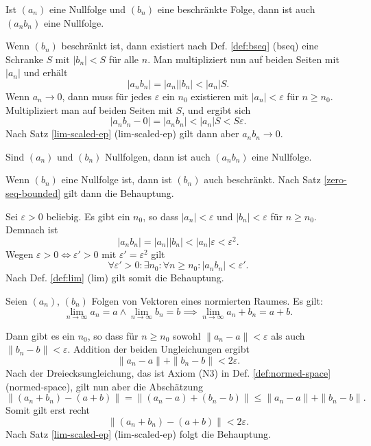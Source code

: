 \begin{Satz}\label{zero-seq-bounded}
Ist $(a_n)$ eine Nullfolge und $(b_n)$ eine beschränkte Folge,
dann ist auch $(a_n b_n)$ eine Nullfolge.
\end{Satz}

\begin{Beweis}
Wenn $(b_n)$ beschränkt ist, dann existiert nach
Def. \ref{def:bseq} (bseq) eine Schranke $S$ mit
$|b_n|<S$ für alle $n$. Man multipliziert nun auf beiden Seiten
mit $|a_n|$ und erhält
\[|a_n b_n| = |a_n| |b_n| < |a_n| S.\]
Wenn $a_n\to 0$, dann muss für jedes $\varepsilon$
ein $n_0$ existieren mit $|a_n|<\varepsilon$ für $n\ge n_0$.
Multipliziert man auf beiden Seiten mit $S$, und ergibt sich
\[|a_n b_n-0| = |a_n b_n| < |a_n| S < S\varepsilon.\]
Nach Satz \ref{lim-scaled-ep} (lim-scaled-ep) gilt dann
aber $a_n b_n\to 0$.\,\qedsymbol
\end{Beweis}

\begin{Satz}
Sind $(a_n)$ und $(b_n)$ Nullfolgen,
dann ist auch $(a_n b_n)$ eine Nullfolge.
\end{Satz}

\begin{Beweis}[Beweis 1]
Wenn $(b_n)$ eine Nullfolge ist, dann ist $(b_n)$ auch beschränkt.
Nach Satz \ref{zero-seq-bounded} gilt dann die Behauptung.
\end{Beweis}

\begin{Beweis}[Beweis 2]
Sei $\varepsilon>0$ beliebig.
Es gibt ein $n_0$, so dass
$|a_n|<\varepsilon$ und $|b_n|<\varepsilon$ für $n\ge n_0$.
Demnach ist
\[|a_n b_n| = |a_n| |b_n|< |a_n|\varepsilon <\varepsilon^2.\]
Wegen $\varepsilon>0\iff\varepsilon'>0$ mit
$\varepsilon'=\varepsilon^2$ gilt
\[\forall\varepsilon'{>}0\colon\exists n_0\colon\forall n{\ge}n_0\colon
|a_n b_n|<\varepsilon'.\]
Nach Def. \ref{def:lim} (lim) gilt somit die Behauptung.\,\qedsymbol
\end{Beweis}

\newpage
\begin{Satz}%
\label{lim-add}
Seien $(a_n)$, $(b_n)$ Folgen von Vektoren eines normierten Raumes.
Es gilt:
\[\lim_{n\to\infty} a_n = a\land \lim_{n\to\infty} b_n
= b \implies \lim_{n\to\infty} a_n+b_n = a+b.\]
\end{Satz}

\begin{Beweis}
Dann gibt es ein $n_0$, so dass für $n\ge n_0$ sowohl
$\|a_n-a\|<\varepsilon$ als auch $\|b_n-b\|<\varepsilon$.
Addition der beiden Ungleichungen ergibt
\[\|a_n-a\| + \|b_n-b\| < 2\varepsilon.\]
Nach der Dreiecksungleichung, das ist Axiom (N3) in Def.
\ref{def:normed-space} (normed-space), gilt nun aber die Abschätzung
\[\|(a_n+b_n)-(a+b)\| = \|(a_n-a)+(b_n-b)\| \le \|a_n-a\|+\|b_n-b\|.\]
Somit gilt erst recht
\[\|(a_n+b_n)-(a+b)\| < 2\varepsilon.\]
Nach Satz \ref{lim-scaled-ep} (lim-scaled-ep)
folgt die Behauptung.\,\qedsymbol
\end{Beweis}


